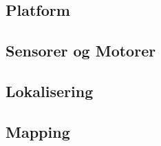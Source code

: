 \subsection{Platform}
\subsection{Sensorer og Motorer}
\subsection{Lokalisering}
\subsection{Mapping}